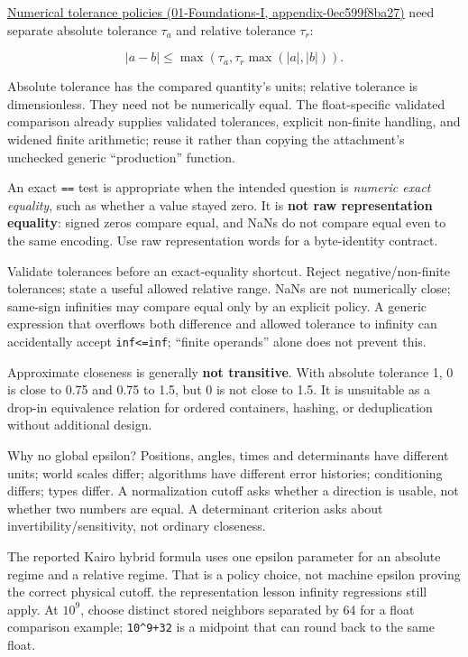 \href{../01-Foundations-I/main.pdf\#nameddest=appendix-0ec599f8ba27}{Numerical tolerance policies (01-Foundations-I, appendix-0ec599f8ba27)} need separate absolute tolerance \(\tau_a\) and relative tolerance \(\tau_r\):

\[
|a-b|\le\max\!\left(\tau_a,\tau_r\max(|a|,|b|)\right).
\]

Absolute tolerance has the compared quantity's units; relative tolerance is dimensionless. They need not be numerically equal. The float-specific validated comparison already supplies validated tolerances, explicit non-finite handling, and widened finite arithmetic; reuse it rather than copying the attachment's unchecked generic ``production'' function.

An exact \texttt{==} test is appropriate when the intended question is \emph{numeric exact equality}, such as whether a value stayed zero. It is \textbf{not raw representation equality}: signed zeros compare equal, and NaNs do not compare equal even to the same encoding. Use raw representation words for a byte-identity contract.

Validate tolerances before an exact-equality shortcut. Reject negative/non-finite tolerances; state a useful allowed relative range. NaNs are not numerically close; same-sign infinities may compare equal only by an explicit policy. A generic expression that overflows both difference and allowed tolerance to infinity can accidentally accept \texttt{inf\textless{}=inf}; ``finite operands'' alone does not prevent this.

Approximate closeness is generally \textbf{not transitive}. With absolute tolerance 1, 0 is close to 0.75 and 0.75 to 1.5, but 0 is not close to 1.5. It is unsuitable as a drop-in equivalence relation for ordered containers, hashing, or deduplication without additional design.

Why no global epsilon? Positions, angles, times and determinants have different units; world scales differ; algorithms have different error histories; conditioning differs; types differ. A normalization cutoff asks whether a direction is usable, not whether two numbers are equal. A determinant criterion asks about invertibility/sensitivity, not ordinary closeness.

The reported Kairo hybrid formula uses one epsilon parameter for an absolute regime and a relative regime. That is a policy choice, not machine epsilon proving the correct physical cutoff. the representation lesson infinity regressions still apply. At \(10^9\), choose distinct stored neighbors separated by 64 for a float comparison example; \texttt{10\^{}9+32} is a midpoint that can round back to the same float.

